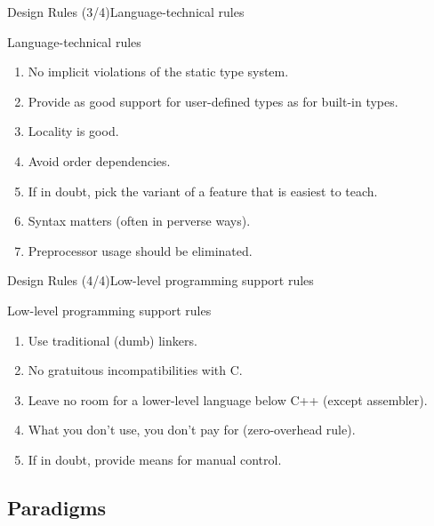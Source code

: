 \begin{frame}{Design Rules (3/4)}{Language-technical rules}
  \begin{block}{Language-technical rules}
    \begin{enumerate}
    \item
      No implicit violations of the static type system.
    \item
      Provide as good support for user-defined types as for built-in types.
    \item
      Locality is good.
    \item
      Avoid order dependencies.
    \item
      If in doubt, pick the variant of a feature that is easiest to teach.
    \item
      Syntax matters (often in perverse ways).
    \item
      Preprocessor usage should be eliminated.
    \end{enumerate}
  \end{block}
\end{frame}

\begin{frame}{Design Rules (4/4)}{Low-level programming support rules}
  \begin{block}{Low-level programming support rules}
    \begin{enumerate}
    \item
      Use traditional (dumb) linkers.
    \item
      No gratuitous incompatibilities with C.
    \item
      Leave no room for a lower-level language below C++ (except assembler).
    \item
      What you don’t use, you don’t pay for (zero-overhead rule).
    \item
      If in doubt, provide means for manual control.
    \end{enumerate}
  \end{block}
\end{frame}

\subsection{\CCLang Paradigms}

